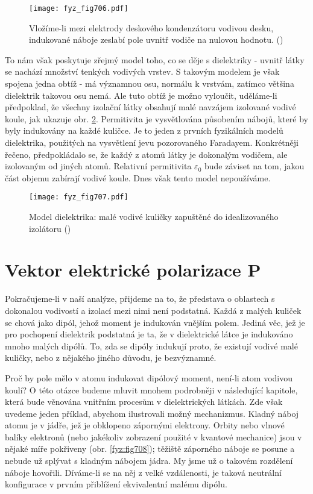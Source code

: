     \begin{figure}[ht!] %
      \centering
      \texttt{[image: fyz\_fig706.pdf]}
      \caption{Vložíme-li mezi elektrody deskového kondenzátoru vodivou desku, indukované náboje
               zeslabí pole uvnitř vodiče na nulovou hodnotu. (\cite[s.~175]{Feynman02})}
      \label{fyz:fig706}
    \end{figure}

    To nám však poskytuje zřejmý model toho, co se děje s dielektriky - uvnitř látky se nachází
    množství tenkých vodivých vrstev. S takovým modelem je však spojena jedna obtíž - má významnou
    osu, normálu k vrstvám, zatímco většina dielektrik takovou osu nemá. Ale tuto obtíž je možno
    vyloučit, uděláme-li předpoklad, že všechny izolační látky obsahují malé navzájem izolované
    vodivé koule, jak ukazuje obr. \ref{fyz:fig707}. Permitivita je vysvětlována působením nábojů,
    které by byly indukovány na každé kuličce. Je to jeden z prvních fyzikálních modelů dielektrika,
    použitých na vysvětlení jevu pozorovaného Faradayem. Konkrétněji řečeno, předpokládalo se, že
    každý z atomů látky je dokonalým vodičem, ale izolovaným od jiných atomů. Relativní permitivita
    \(\varepsilon_0\) bude záviset na tom, jakou část objemu zabírají vodivé koule. Dnes však tento
    model nepoužíváme.

    \begin{figure}[ht!] %
      \centering
      \texttt{[image: fyz\_fig707.pdf]}
      \caption{Model dielektrika: malé vodivé kuličky zapuštěné do idealizovaného izolátoru
               (\cite[s.~176]{Feynman02})}
      \label{fyz:fig707}
    \end{figure}

  \section{Vektor elektrické polarizace P}\label{fyz:IIchapXsecII} 
    Pokračujeme-li v naší analýze, přijdeme na to, že představa o oblastech s dokonalou vodivostí a
    izolací mezi nimi není podstatná. Každá z malých kuliček se chová jako dipól, jehož moment je
    indukován vnějším polem. Jediná věc, jež je pro pochopení dielektrik podstatná je ta, že v
    dielektrické látce je indukováno mnoho malých dipólů. To, zda se dipóly indukují proto, že
    existují vodivé malé kuličky, nebo z nějakého jiného důvodu, je bezvýznamné.

    Proč by pole mělo v atomu indukovat dipólový moment, není-li atom vodivou koulí? O této otázce
    budeme mluvit mnohem podrobněji v následující kapitole, která bude věnována vnitřním procesům v
    dielektrických látkách. Zde však uvedeme jeden příklad, abychom ilustrovali možný mechanizmus.
    Kladný náboj atomu je v jádře, jež je obklopeno zápornými elektrony. Orbity nebo vlnové balíky
    elektronů (nebo jakékoliv zobrazení použité v kvantové mechanice) jsou v nějaké míře pokřiveny
    (obr. \ref{fyz:fig708}); těžiště záporného náboje se posune a nebude už splývat s kladným
    nábojem jádra. My jsme už o takovém rozdělení náboje hovořili. Díváme-li se na něj z velké
    vzdálenosti, je taková neutrální konfigurace v prvním přiblížení ekvivalentní malému dipólu.

